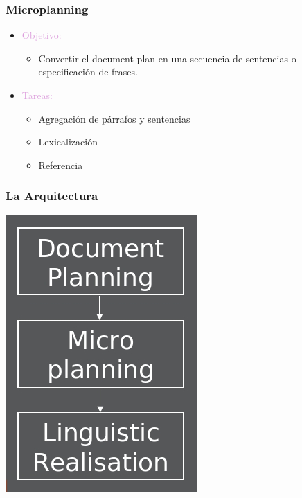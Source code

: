 \documentclass[compress,color=usenames]{beamer}
\newcommand{\mH}[1]{\textcolor{Plum}{#1}}
\begin{document}
\begin{frame}
\frametitle{Microplanning}

\label{f196}
\begin{itemize}
\item { \mH{Objetivo: }}
\begin{itemize}
\item Convertir el document plan en una secuencia de sentencias o especificaci\'on de frases.
\end{itemize}
\item { \mH{Tareas:}}
\begin{itemize}
\item Agregaci\'on de p\'arrafos y sentencias
\item Lexicalizaci\'on
\item Referencia 
\end{itemize}
\end{itemize}
 
\end{frame}

\begin{frame}
\frametitle{La Arquitectura}

\begin{center}
\includegraphics[scale=.4]{pics/pic11.jpg}
\end{center}
 
\end{frame}
\end{document}
